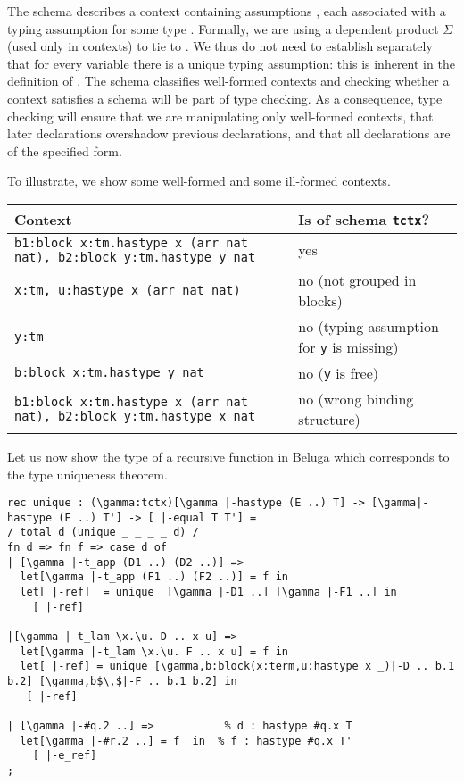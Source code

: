 The schema  describes a context containing assumptions
, each associated with a typing assumption 
for some type .  Formally, we are using a dependent product $\Sigma$
(used only in contexts) to tie  to .
We thus do not need to establish separately that for every variable there is a
unique typing assumption: this is inherent in the definition of .
The schema classifies well-formed contexts and checking whether a
context satisfies a schema will be part of type checking. As a
consequence, type checking will ensure that we are manipulating only
well-formed contexts, that later declarations overshadow previous
declarations, and that all declarations are of the specified form.

To illustrate, we show some well-formed  and some ill-formed
contexts.

\begin{center}
\begin{tabular}{p{7.5cm}|p{8cm}}
\hspace{2cm}Context & \hspace{1.5cm}Is of schema \lstinline!tctx!?\\
\hline
\lstinline!b1:block x:tm.hastype x (arr nat nat), b2:block y:tm.hastype y nat!
& yes \\ \hline
\lstinline!x:tm, u:hastype x (arr nat nat)! & no (not grouped in blocks)
\\\hline
\lstinline!y:tm! & no (typing assumption for \lstinline!y! is
missing) \\\hline
\lstinline!b:block x:tm.hastype y nat! & no (\lstinline!y! is free) \\
\hline
\lstinline!b1:block x:tm.hastype x (arr nat nat), b2:block y:tm.hastype x nat!
& no (wrong binding structure)
\end{tabular}
\end{center}



Let us now show the type of a recursive function in Beluga which
corresponds to the type uniqueness theorem.


\begin{lstlisting}[caption={Type Uniqueness Proof},label=list:8-6,captionpos=b,float,abovecaptionskip=-\medskipamount]
rec unique : (\gamma:tctx)[\gamma |-hastype (E ..) T] -> [\gamma|-hastype (E ..) T'] -> [ |-equal T T'] =
/ total d (unique _ _ _ _ d) /
fn d => fn f => case d of
| [\gamma |-t_app (D1 ..) (D2 ..)] =>
  let[\gamma |-t_app (F1 ..) (F2 ..)] = f in
  let[ |-ref]  = unique  [\gamma |-D1 ..] [\gamma |-F1 ..] in
    [ |-ref]

|[\gamma |-t_lam \x.\u. D .. x u] =>
  let[\gamma |-t_lam \x.\u. F .. x u] = f in
  let[ |-ref] = unique [\gamma,b:block(x:term,u:hastype x _)|-D .. b.1 b.2] [\gamma,b$\,$|-F .. b.1 b.2] in
   [ |-ref]

| [\gamma |-#q.2 ..] =>           % d : hastype #q.x T
  let[\gamma |-#r.2 ..] = f  in  % f : hastype #q.x T'
    [ |-e_ref]
;
\end{lstlisting}


